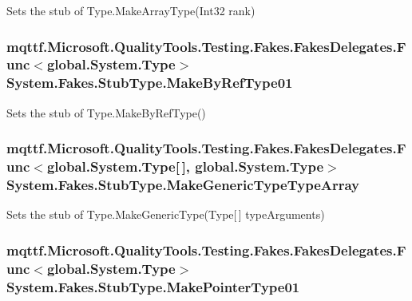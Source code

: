 Sets the stub of Type.\-Make\-Array\-Type(\-Int32 rank)

\hypertarget{class_system_1_1_fakes_1_1_stub_type_abc78973f0cee62dc90294dd13f8f141e}{
\subsubsection[{Make\-By\-Ref\-Type01}]{\setlength{\rightskip}{0pt plus 5cm}mqttf.\-Microsoft.\-Quality\-Tools.\-Testing.\-Fakes.\-Fakes\-Delegates.\-Func$<$global.\-System.\-Type$>$ System.\-Fakes.\-Stub\-Type.\-Make\-By\-Ref\-Type01}}\label{class_system_1_1_fakes_1_1_stub_type_abc78973f0cee62dc90294dd13f8f141e}


Sets the stub of Type.\-Make\-By\-Ref\-Type()

\hypertarget{class_system_1_1_fakes_1_1_stub_type_a4f7ae0065b50bed8648b05398884f751}{
\subsubsection[{Make\-Generic\-Type\-Type\-Array}]{\setlength{\rightskip}{0pt plus 5cm}mqttf.\-Microsoft.\-Quality\-Tools.\-Testing.\-Fakes.\-Fakes\-Delegates.\-Func$<$global.\-System.\-Type\mbox{[}$\,$\mbox{]}, global.\-System.\-Type$>$ System.\-Fakes.\-Stub\-Type.\-Make\-Generic\-Type\-Type\-Array}}\label{class_system_1_1_fakes_1_1_stub_type_a4f7ae0065b50bed8648b05398884f751}


Sets the stub of Type.\-Make\-Generic\-Type(\-Type\mbox{[}$\,$\mbox{]} type\-Arguments)

\hypertarget{class_system_1_1_fakes_1_1_stub_type_afc3613e61f7d6507a562daf019cb7468}{
\subsubsection[{Make\-Pointer\-Type01}]{\setlength{\rightskip}{0pt plus 5cm}mqttf.\-Microsoft.\-Quality\-Tools.\-Testing.\-Fakes.\-Fakes\-Delegates.\-Func$<$global.\-System.\-Type$>$ System.\-Fakes.\-Stub\-Type.\-Make\-Pointer\-Type01}}\label{class_system_1_1_fakes_1_1_stub_type_afc3613e61f7d6507a562daf019cb7468}


